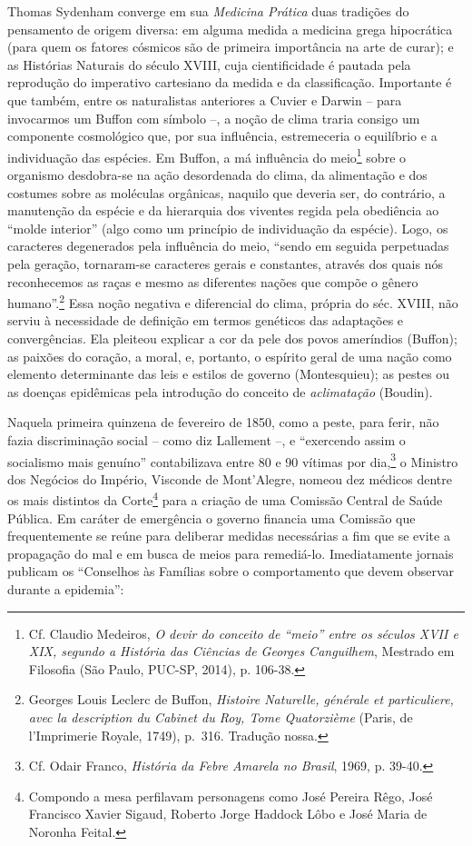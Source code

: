 Thomas Sydenham converge em sua \emph{Medicina Prática} duas tradições
do pensamento de origem diversa: em alguma medida a medicina grega
hipocrática (para quem os fatores cósmicos são de primeira importância
na arte de curar); e as Histórias Naturais do século XVIII, cuja
cientificidade é pautada pela reprodução do imperativo cartesiano da
medida e da classificação. Importante é que também, entre os
naturalistas anteriores a Cuvier e Darwin -- para invocarmos um Buffon
com símbolo --, a noção de clima traria consigo um componente
cosmológico que, por sua influência, estremeceria o equilíbrio e a
individuação das espécies. Em Buffon, a má influência do meio\footnote{Cf.
  Claudio Medeiros, \emph{O devir do conceito de ``meio'' entre os
  séculos XVII e XIX, segundo a História das Ciências de Georges
  Canguilhem}, Mestrado em Filosofia (São Paulo, PUC-SP, 2014), p.
  106-38.} sobre o organismo desdobra-se na ação desordenada do clima,
da alimentação e dos costumes sobre as moléculas orgânicas, naquilo que
deveria ser, do contrário, a manutenção da espécie e da hierarquia dos
viventes regida pela obediência ao ``molde interior'' (algo como um
princípio de individuação da espécie). Logo, os caracteres degenerados
pela influência do meio, ``sendo em seguida perpetuadas pela geração,
tornaram-se caracteres gerais e constantes, através dos quais nós
reconhecemos as raças e mesmo as diferentes nações que compõe o gênero
humano''.\footnote{Georges Louis Leclerc de Buffon, \emph{Histoire
  Naturelle, générale et particuliere, avec la description du Cabinet du
  Roy, Tome Quatorzième} (Paris, de l'Imprimerie Royale, 1749), p.~316.
  Tradução nossa.} Essa noção negativa e diferencial do clima, própria
do séc. XVIII, não serviu à necessidade de definição em termos genéticos
das adaptações e convergências. Ela pleiteou explicar a cor da pele dos
povos ameríndios (Buffon); as paixões do coração, a moral, e, portanto,
o espírito geral de uma nação como elemento determinante das leis e
estilos de governo (Montesquieu); as pestes ou as doenças epidêmicas
pela introdução do conceito de \emph{aclimatação} (Boudin).

Naquela primeira quinzena de fevereiro de 1850, como a peste, para
ferir, não fazia discriminação social -- como diz Lallement --, e
``exercendo assim o socialismo mais genuíno'' contabilizava entre 80 e
90 vítimas por dia,\footnote{Cf. Odair Franco, \emph{História da Febre
  Amarela no Brasil}, 1969, p. 39-40.} o Ministro dos Negócios do
Império, Visconde de Mont'Alegre, nomeou dez médicos dentre os mais
distintos da Corte\footnote{Compondo a mesa perfilavam personagens como
  José Pereira Rêgo, José Francisco Xavier Sigaud, Roberto Jorge Haddock
  Lôbo e José Maria de Noronha Feital.} para a criação de uma Comissão
Central de Saúde Pública. Em caráter de emergência o governo financia
uma Comissão que frequentemente se reúne para deliberar medidas
necessárias a fim que se evite a propagação do mal e em busca de meios
para remediá-lo. Imediatamente jornais publicam os ``Conselhos às
Famílias sobre o comportamento que devem observar durante a epidemia'':

